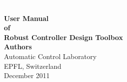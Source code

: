 
\begin{titlepage}

\textcolor{white}{.} \\
\vspace{1cm}
\begin{center}
\Large{\textbf{User Manual}} \\[.5 cm]
\Large{\textbf{of}}\\ [.5 cm]
\Large{\textbf{Robust Controller Design Toolbox}} \\ [6 cm]
\textbf{Authors}\\ [5 cm]

{Automatic Control Laboratory\\
EPFL, Switzerland\\
December 2011}
\end{center}
\end{titlepage}
